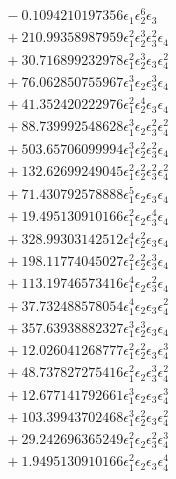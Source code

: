 \documentclass[10pt]{article}
\begin{document}
\begin{align*}
&{}  - 0.1094210197356 \epsilon_{1} \epsilon_{2}^{6} \epsilon_{3} \\
&{}  + 210.99358987959 \epsilon_{1}^{2} \epsilon_{2}^{3} \epsilon_{3}^{2} \epsilon_{4} \\
&{}  + 30.716899232978 \epsilon_{1}^{2} \epsilon_{2}^{3} \epsilon_{3} \epsilon_{4}^{2} \\
&{}  + 76.062850755967 \epsilon_{1}^{3} \epsilon_{2} \epsilon_{3}^{3} \epsilon_{4} \\
&{}  + 41.352420222976 \epsilon_{1}^{2} \epsilon_{2}^{4} \epsilon_{3} \epsilon_{4} \\
&{}  + 88.739992548628 \epsilon_{1}^{3} \epsilon_{2} \epsilon_{3}^{2} \epsilon_{4}^{2} \\
&{}  + 503.65706099994 \epsilon_{1}^{3} \epsilon_{2}^{2} \epsilon_{3}^{2} \epsilon_{4} \\
&{}  + 132.62699249045 \epsilon_{1}^{2} \epsilon_{2}^{2} \epsilon_{3}^{2} \epsilon_{4}^{2} \\
&{}  + 71.430792578888 \epsilon_{1}^{5} \epsilon_{2} \epsilon_{3} \epsilon_{4} \\
&{}  + 19.495130910166 \epsilon_{1}^{2} \epsilon_{2} \epsilon_{3}^{4} \epsilon_{4} \\
&{}  + 328.99303142512 \epsilon_{1}^{4} \epsilon_{2}^{2} \epsilon_{3} \epsilon_{4} \\
&{}  + 198.11774045027 \epsilon_{1}^{2} \epsilon_{2}^{2} \epsilon_{3}^{3} \epsilon_{4} \\
&{}  + 113.19746573416 \epsilon_{1}^{4} \epsilon_{2} \epsilon_{3}^{2} \epsilon_{4} \\
&{}  + 37.732488578054 \epsilon_{1}^{4} \epsilon_{2} \epsilon_{3} \epsilon_{4}^{2} \\
&{}  + 357.63938882327 \epsilon_{1}^{3} \epsilon_{2}^{3} \epsilon_{3} \epsilon_{4} \\
&{}  + 12.026041268777 \epsilon_{1}^{2} \epsilon_{2}^{2} \epsilon_{3} \epsilon_{4}^{3} \\
&{}  + 48.737827275416 \epsilon_{1}^{2} \epsilon_{2} \epsilon_{3}^{3} \epsilon_{4}^{2} \\
&{}  + 12.677141792661 \epsilon_{1}^{3} \epsilon_{2} \epsilon_{3} \epsilon_{4}^{3} \\
&{}  + 103.39943702468 \epsilon_{1}^{3} \epsilon_{2}^{2} \epsilon_{3} \epsilon_{4}^{2} \\
&{}  + 29.242696365249 \epsilon_{1}^{2} \epsilon_{2} \epsilon_{3}^{2} \epsilon_{4}^{3} \\
&{}  + 1.9495130910166 \epsilon_{1}^{2} \epsilon_{2} \epsilon_{3} \epsilon_{4}^{4} \\

\end{align*}
\end{document}
